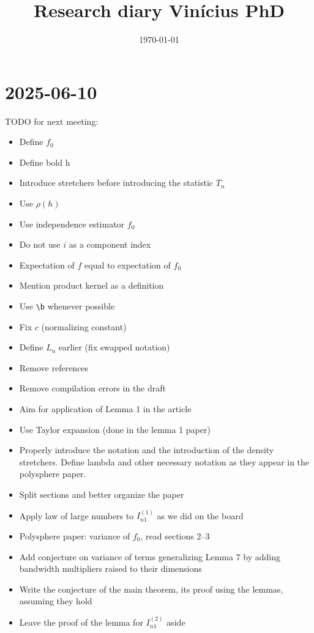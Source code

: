 \documentclass{article}
\title{Research diary Vinícius PhD}
\date{\today}
\begin{document}
\maketitle

\section*{2025-06-10}

TODO for next meeting:
\begin{itemize}
    \item[$\checkmark$] Define $f_0$
    \item[$\checkmark$] Define bold h
    \item[$\checkmark$] Introduce stretchers before introducing the statistic $T_n$
    \item[$\checkmark$] Use $\rho(h)$
    \item[$\checkmark$] Use independence estimator $f_0$
    \item[$\checkmark$] Do not use $i$ as a component index
    \item[$\checkmark$] Expectation of $f$ equal to expectation of $f_0$
    \item[$\checkmark$] Mention product kernel as a definition
    \item[$\checkmark$] Use \verb|\b| whenever possible
    \item[$\checkmark$] Fix $c$ (normalizing constant)
    \item[$\checkmark$] Define $L_u$ earlier (fix swapped notation)
    \item[$\checkmark$] Remove references
    \item [$\checkmark$] Remove compilation errors in the draft
    \item Aim for application of Lemma 1 in the article
    \item Use Taylor expansion (done in the lemma 1 paper)
    \item [$\checkmark$] Properly introduce the notation and the introduction of the density stretchers. Define lambda and other necessary notation as they appear in the polysphere paper.
    \item[$\checkmark$] Split sections and better organize the paper
    \item [$\checkmark$] Apply law of large numbers to $I_{n1}^{(1)}$ as we did on the board
    \item [$\checkmark$] Polysphere paper: variance of $f_0$, read sections 2–3
    \item[$\checkmark$] Add conjecture on variance of terms generalizing Lemma 7 by adding bandwidth multipliers raised to their dimensions
    \item [$\checkmark$] Write the conjecture of the main theorem, its proof using the lemmas, assuming they hold
    \item [$\checkmark$] Leave the proof of the lemma for $I_{n1}^{(2)}$ aside
\end{itemize}
\end{document}
